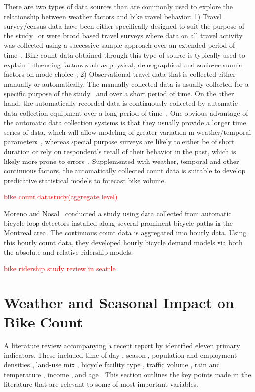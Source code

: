 \documentclass [11pt, proquest] {uwthesis}[2015/03/03]
\begin{document}
There are two types of data sources than are commonly used to explore the relationship between weather factors and bike travel behavior: 1) Travel survey/census data have been either specifically designed to suit the purpose of the study~\cite{Palma97}  or were broad based travel surveys where data on all travel activity was collected using a successive sample approach over an extended period of time~\cite{Richardson:2000aa}. Bike count data obtained through this type of source is typically used to explain influencing factors such as physical, demographical and socio-economic factors on mode choice~\cite{Parkin:2008aa,Helbich:2014aa}; 2) Observational travel data that is collected either manually or automatically. The manually collected data is usually collected for a specific purpose of the study~\cite{Nankervis99} and over a short period of time. On the other hand, the automatically recorded data is continuously collected by automatic data collection equipment over a long period of time~\cite{Griswold:2011aa, Nosal:2014aa, Miranda-Moreno:2011aa, Thomas:2009aa}. One obvious advantage of the automatic data collection systems is that they usually provide a longer time series of data, which will allow modeling of greater variation in weather/temporal parameters~\cite{Ahmed12}, whereas special purpose surveys are likely to either be of short duration or rely on respondent's recall of their behavior in the past, which is likely more prone to errors~\cite{Palma97}. Supplemented with weather, temporal and other continuous factors, the automatically collected count data is suitable to develop predicative statistical models to forecast bike volume.  

\textcolor{red}{bike count datastudy(aggregate level)}

Moreno and Nosal~\cite{Miranda-Moreno:2011aa} conducted a study using data collected from automatic bicycle loop detectors installed along several prominent bicycle paths in the Montreal area. The continuous count data is aggregated into hourly data. Using this hourly count data, they developed hourly bicycle demand models via both the absolute and relative ridership models. 

\textcolor{red}{bike ridership study review in seattle}

\section{Weather and Seasonal Impact on Bike Count}

A literature review accompanying a recent report by \cite{Bassok:2011aa} identified eleven primary indicators. These included 
time of day \cite{Schwartz:1999aa}, season \cite{Niemeier:1996aa}, population and employment densities \cite{McCahil:2008aa,Pinjari:2009aa}, land-use mix \cite{Pinjari:2009aa}, bicycle facility type \cite{Hunt:2007aa}, traffic volume \cite{McDonald:2007aa}, rain and temperature \cite{Niemeier:1996aa,Parkin:2008aa}, income \cite{Turner:1998aa}, and age \cite{Hunt:2007aa}. This section outlines the key points made in the literature that are relevant to some of most important variables. 
\end{document}
